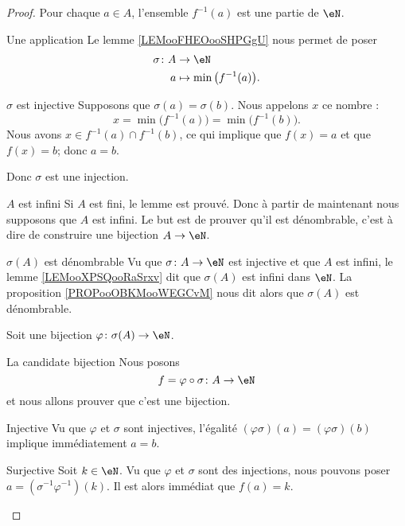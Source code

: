 \begin{proof}
    Pour chaque \( a\in A\), l'ensemble \( f^{-1}(a)\) est une partie de \( \eN\). 
    \begin{subproof}
        \item[Une application]
            Le lemme \ref{LEMooFHEOooSHPGgU} nous permet de poser
            \begin{equation}
                \begin{aligned}
                    \sigma\colon A&\to \eN \\
                    a&\mapsto \min\big( f^{-1}(a) \big). 
                \end{aligned}
            \end{equation}
        \item[\( \sigma\) est injective]
            Supposons que \( \sigma(a)=\sigma(b)\). Nous appelons \( x\) ce nombre :
            \begin{equation}
                x=\min\big( f^{-1}(a) \big)=\min\big( f^{-1}(b) \big).
            \end{equation}
            Nous avons \( x\in f^{-1}(a)\cap f^{-1}(b)\), ce qui implique que \( f(x)=a\) et que \( f(x)=b\); donc \( a=b\).

            Donc \( \sigma\) est une injection.
        \item[\( A\) est infini]
            Si \( A\) est fini, le lemme est prouvé. Donc à partir de maintenant nous supposons que \( A\) est infini. Le but est de prouver qu'il est dénombrable, c'est à dire de construire une bijection \( A\to \eN\).
        \item[\( \sigma(A)\) est dénombrable]
            Vu que \( \sigma\colon A\to  \eN\) est injective et que \( A\) est infini, le lemme \ref{LEMooXPSQooRaSrxv} dit que \( \sigma(A)\) est infini dans \( \eN\). La proposition \ref{PROPooOBKMooWEGCvM} nous dit alors que \( \sigma(A)\) est dénombrable.

            Soit une bijection \( \varphi\colon \sigma(A)\to \eN\).
        \item[La candidate bijection]
            Nous posons
            \begin{equation}
                f=\varphi\circ \sigma\colon A\to \eN
            \end{equation}
            et nous allons prouver que c'est une bijection.
        \item[Injective]
            Vu que \( \varphi\) et \( \sigma\) sont injectives, l'égalité \( (\varphi\sigma)(a)=(\varphi\sigma)(b)\) implique immédiatement \( a=b\).
        \item[Surjective]
            Soit \( k\in \eN\). Vu que \( \varphi\) et \( \sigma\) sont des injections, nous pouvons poser \( a=(\sigma^{-1}\varphi^{-1})(k)\). Il est alors immédiat que \( f(a)=k\).
    \end{subproof}
\end{proof}

